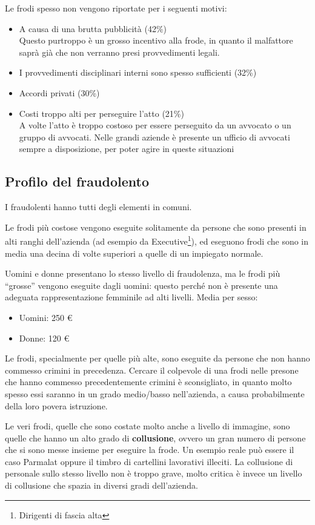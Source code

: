 Le frodi spesso non vengono riportate per i seguenti motivi:
\begin{itemize}
  \item A causa di una brutta pubblicità (42\%) \\
  Questo purtroppo è un grosso incentivo alla frode, in quanto il malfattore
  saprà già che non verranno presi provvedimenti legali.
  \item I provvedimenti disciplinari interni sono spesso sufficienti (32\%)
  \item Accordi privati (30\%)
  \item Costi troppo alti per perseguire l'atto (21\%) \\
  A volte l'atto è troppo costoso per essere perseguito da un avvocato o un
  gruppo di avvocati. Nelle grandi aziende è presente un ufficio di avvocati
  sempre a disposizione, per poter agire in queste situazioni
\end{itemize}

\subsection{Profilo del fraudolento}

I fraudolenti hanno tutti degli elementi in comuni.

Le frodi più costose vengono eseguite solitamente da persone che sono presenti
in alti ranghi dell'azienda (ad esempio da Executive\footnote{Dirigenti di
fascia alta}), ed eseguono frodi che sono in media una decina di volte
superiori a quelle di un impiegato normale.

Uomini e donne presentano lo stesso livello di fraudolenza, ma le frodi più
``grosse'' vengono eseguite dagli uomini: questo perché non è presente una
adeguata rappresentazione femminile ad alti livelli.
Media per sesso:
\begin{itemize}
  \item Uomini: 250 \euro
  \item Donne: 120 \euro
\end{itemize}

Le frodi, specialmente per quelle più alte, sono eseguite da persone che non
hanno commesso crimini in precedenza.
Cercare il colpevole di una frodi nelle presone che hanno commesso
precedentemente crimini è sconsigliato, in quanto molto spesso essi saranno in
un grado medio/basso nell'azienda, a causa probabilmente della loro povera
istruzione.

Le veri frodi, quelle che sono costate molto anche a livello di immagine, sono
quelle che hanno un alto grado di \textbf{collusione}, ovvero un gran numero di
persone che si sono messe insieme per eseguire la frode. Un esempio reale può
essere il caso Parmalat oppure il timbro di cartellini lavorativi illeciti. La
collusione di personale sullo stesso livello non è troppo grave, molto critica
è invece un livello di collusione che spazia in diversi gradi dell'azienda.

